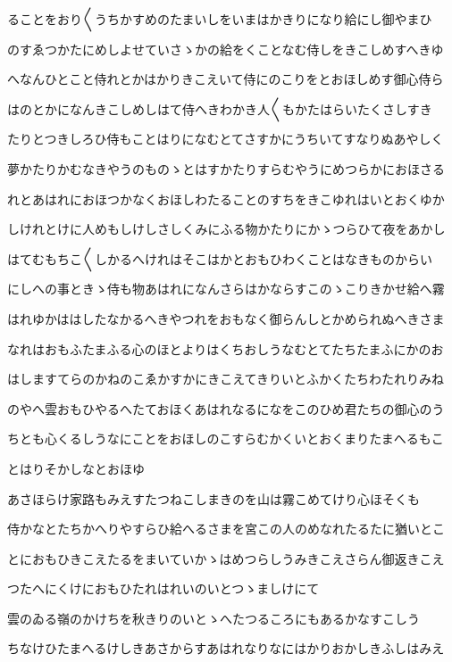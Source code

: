 \documentclass[a4paper,11pt,landscape]{ltjtarticle}
\begin{document}
\par\medskip
ることをおり〱うちかすめのたまいしをいまはかきりになり給にし御やまひ
\par\medskip
のすゑつかたにめしよせていさゝかの給をくことなむ侍しをきこしめすへきゆ
\par\medskip
へなんひとこと侍れとかはかりきこえいて侍にのこりをとおほしめす御心侍ら
\par\medskip
はのとかになんきこしめしはて侍へきわかき人〱もかたはらいたくさしすき
\par\medskip
たりとつきしろひ侍もことはりになむとてさすかにうちいてすなりぬあやしく
\par\medskip
夢かたりかむなきやうのものゝとはすかたりすらむやうにめつらかにおほさる
\par\medskip
れとあはれにおほつかなくおほしわたることのすちをきこゆれはいとおくゆか
\par\medskip
しけれとけに人めもしけしさしくみにふる物かたりにかゝつらひて夜をあかし
\par\medskip
はてむもちこ〱しかるへけれはそこはかとおもひわくことはなきものからい
\par\medskip
にしへの事ときゝ侍も物あはれになんさらはかならすこのゝこりきかせ給へ霧
\par\medskip
はれゆかははしたなかるへきやつれをおもなく御らんしとかめられぬへきさま
\par\medskip
なれはおもふたまふる心のほとよりはくちおしうなむとてたちたまふにかのお
\par\medskip
はしますてらのかねのこゑかすかにきこえてきりいとふかくたちわたれりみね
\par\medskip
のやへ雲おもひやるへたておほくあはれなるになをこのひめ君たちの御心のう
\par\medskip
ちとも心くるしうなにことをおほしのこすらむかくいとおくまりたまへるもこ
\par\medskip
とはりそかしなとおほゆ
\par\medskip
あさほらけ家路もみえすたつねこしまきのを山は霧こめてけり心ほそくも
\par\medskip
侍かなとたちかへりやすらひ給へるさまを宮この人のめなれたるたに猶いとこ
\par\medskip
とにおもひきこえたるをまいていかゝはめつらしうみきこえさらん御返きこえ
\par\medskip
つたへにくけにおもひたれはれいのいとつゝましけにて
\par\medskip
雲のゐる嶺のかけちを秋きりのいとゝへたつるころにもあるかなすこしう
\par\medskip
ちなけひたまへるけしきあさからすあはれなりなにはかりおかしきふしはみえ
\end{document}
